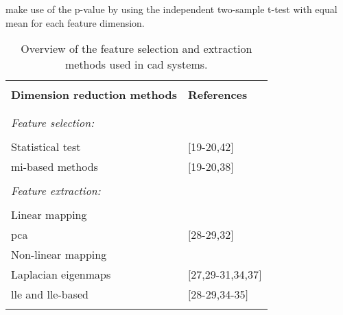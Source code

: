 \cite{Niaf2011,Niaf2012} make use of the p-value by using the independent two-sample t-test with equal mean for each feature dimension. %
%
%
\begin{table}
	\caption{Overview of the feature selection and extraction methods used in \ac{cad} systems.}
	\small
	\begin{tabular}{p{.65\linewidth} p{.25\linewidth}}
		\hline \\ [-1.5ex]
		\textbf{Dimension reduction methods} & \textbf{References} \\ \\ [-1.5ex]
		\hline \\ [-1.5ex]
		\textit{Feature selection:} & \\ \\ [-1.5ex]
		\quad Statistical test & $[$19-20,42$]$ \\
		\quad \ac{mi}-based methods & $[$19-20,38$]$ \\ \\ [-1.5ex]
		\textit{Feature extraction:} & \\ \\ [-1.5ex]
		\quad Linear mapping & \\
		\quad \quad \acs{pca} & $[$28-29,32$]$ \\
		\quad Non-linear mapping & \\
		\quad \quad Laplacian eigenmaps & $[$27,29-31,34,37$]$ \\
		\quad \quad \acs{lle} and \acs{lle}-based & $[$28-29,34-35$]$ \\ \\ [-1.5ex]
		\hline
	\end{tabular}
	\label{tab:featext}
\end{table} 
